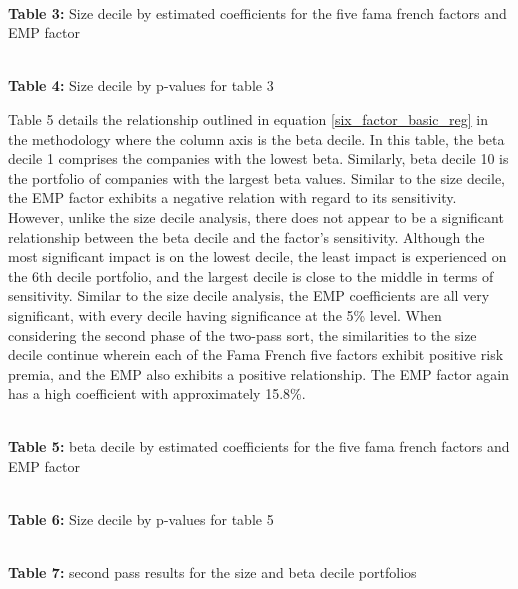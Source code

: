 \documentclass[12pt,oneside,reqno]{amsart}
\begin{document}
\begin{center}
\\
\textbf{Table 3:} Size decile by estimated coefficients for the  five fama french factors and EMP factor
\end{center}
\begin{center}
\\
\textbf{Table 4:} Size decile by p-values for table 3
\end{center}

Table 5 details the relationship outlined in equation \eqref{six_factor_basic_reg} in the methodology where the column axis is the beta decile. In this table,  the beta decile 1 comprises the companies with the lowest beta. Similarly, beta decile 10 is the portfolio of companies with the largest beta values.  Similar to the size decile, the EMP factor exhibits a negative relation with regard to its sensitivity. However, unlike the size decile analysis, there does not appear to be a significant relationship between the beta decile and the factor's sensitivity. Although the most significant impact is on the lowest decile, the least impact is experienced on the 6th decile portfolio, and the largest decile is close to the middle in terms of sensitivity. Similar to the size decile analysis, the EMP coefficients are all very significant, with every decile having significance at the 5\% level. When considering the second phase of the two-pass sort, the similarities to the size decile continue wherein each of the Fama French five factors exhibit positive risk premia, and the EMP also exhibits a positive relationship. The EMP factor again has a high coefficient with approximately 15.8\%. 

\begin{center}

\\
\textbf{Table 5:} beta decile by estimated coefficients for the  five fama french factors and EMP factor
\end{center}
\begin{center}
\\
\textbf{Table 6:} Size decile by p-values for table 5
\end{center}
\begin{center}
\\
\textbf{Table 7:} second pass results for the size and beta decile portfolios
\end{center}
\end{document}
